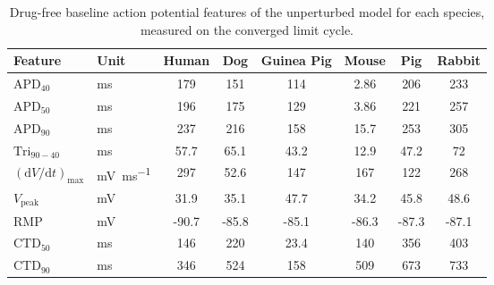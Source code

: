 \begin{table}[t]
\centering
\caption{Drug-free baseline action potential features of the unperturbed model for each species, measured on the converged limit cycle.}
\label{tab:supp-baseline-features}
\footnotesize
\begin{tabular}{l l S S S S S S}
\toprule
\textbf{Feature} & \textbf{Unit} & {\textbf{Human}} & {\textbf{Dog}} & {\textbf{Guinea Pig}} & {\textbf{Mouse}} & {\textbf{Pig}} & {\textbf{Rabbit}} \\
\midrule
$\mathrm{APD}_{40}$ & \si{\milli\second} & 179 & 151 & 114 & 2.86 & 206 & 233 \\
$\mathrm{APD}_{50}$ & \si{\milli\second} & 196 & 175 & 129 & 3.86 & 221 & 257 \\
$\mathrm{APD}_{90}$ & \si{\milli\second} & 237 & 216 & 158 & 15.7 & 253 & 305 \\
$\mathrm{Tri}_{90-40}$ & \si{\milli\second} & 57.7 & 65.1 & 43.2 & 12.9 & 47.2 & 72 \\
$(\mathrm{d}V/\mathrm{d}t)_{\max}$ & \si{\milli\volt\per\milli\second} & 297 & 52.6 & 147 & 167 & 122 & 268 \\
$V_{\mathrm{peak}}$ & \si{\milli\volt} & 31.9 & 35.1 & 47.7 & 34.2 & 45.8 & 48.6 \\
$\mathrm{RMP}$ & \si{\milli\volt} & -90.7 & -85.8 & -85.1 & -86.3 & -87.3 & -87.1 \\
$\mathrm{CTD}_{50}$ & \si{\milli\second} & 146 & 220 & 23.4 & 140 & 356 & 403 \\
$\mathrm{CTD}_{90}$ & \si{\milli\second} & 346 & 524 & 158 & 509 & 673 & 733 \\
\bottomrule
\end{tabular}
\end{table}

